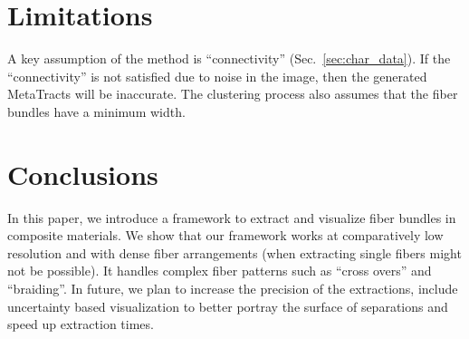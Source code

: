 \section{Limitations}
A key assumption of the method is ``connectivity'' (Sec.~\ref{sec:char_data}).
If the ``connectivity'' is not satisfied due to noise in the image, then the  generated MetaTracts will be inaccurate. 
The clustering process also assumes that the fiber bundles have a minimum width.
\section{Conclusions}
In this paper, we introduce a framework to extract and visualize fiber bundles in composite materials. We show that our framework works at comparatively low resolution and with dense fiber arrangements (when extracting single fibers might not be possible). It handles complex fiber patterns such as ``cross overs'' and ``braiding''.
In future, we plan to increase the precision of the extractions, include uncertainty based visualization to better portray the surface of separations and speed up extraction times.
